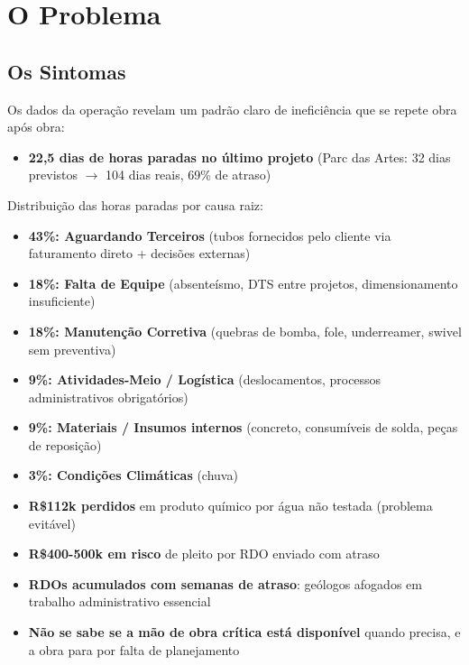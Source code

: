 \documentclass[12pt,a4paper]{scrartcl}
\begin{document}
\section{O Problema}

\subsection{Os Sintomas}

Os dados da operação revelam um padrão claro de ineficiência que se repete obra após obra:

\begin{itemize}
  \item \textbf{22,5 dias de horas paradas no último projeto} (Parc das Artes: 32 dias previstos $\to$ 104 dias reais, 69\% de atraso)
\end{itemize}

Distribuição das horas paradas por causa raiz:

\begin{itemize}
  \item \textbf{43\%: Aguardando Terceiros} (tubos fornecidos pelo cliente via faturamento direto + decisões externas)
  \item \textbf{18\%: Falta de Equipe} (absenteísmo, DTS entre projetos, dimensionamento insuficiente)
  \item \textbf{18\%: Manutenção Corretiva} (quebras de bomba, fole, underreamer, swivel sem preventiva)
  \item \textbf{9\%: Atividades-Meio / Logística} (deslocamentos, processos administrativos obrigatórios)
  \item \textbf{9\%: Materiais / Insumos internos} (concreto, consumíveis de solda, peças de reposição)
  \item \textbf{3\%: Condições Climáticas} (chuva)
\end{itemize}

\begin{itemize}
  \item \textbf{R\$112k perdidos} em produto químico por água não testada (problema evitável)
  \item \textbf{R\$400-500k em risco} de pleito por RDO enviado com atraso
  \item \textbf{RDOs acumulados com semanas de atraso}: geólogos afogados em trabalho administrativo essencial
  \item \textbf{Não se sabe se a mão de obra crítica está disponível} quando precisa, e a obra para por falta de planejamento
\end{itemize}
\end{document}
